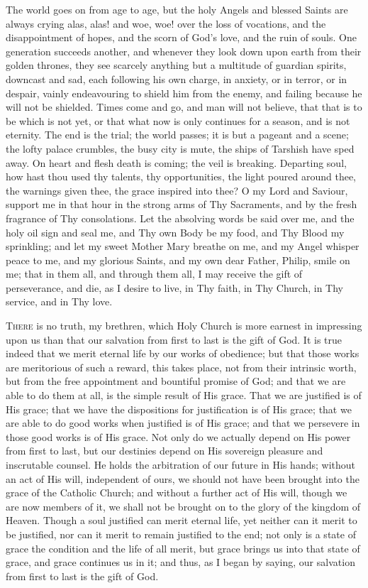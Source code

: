 The world goes on from age to age, but the holy Angels and blessed
Saints are always crying alas, alas! and woe, woe! over the loss of
vocations, and the disappointment of hopes, and the scorn of God's
love, and the ruin of souls. One generation succeeds another, and
whenever they look down upon earth from their golden thrones, they see
scarcely anything but a multitude of guardian spirits, downcast and
sad, each following his own charge, in anxiety, or in terror, or in
despair, vainly endeavouring to shield him from the enemy, and failing
because he will not be shielded. Times come and go, and man will not
believe, that that is to be which is not yet, or that what now is only
continues for a season, and is not eternity. The end is the trial; the
world passes; it is but a pageant and a scene; the lofty palace
crumbles, the busy city is mute, the ships of Tarshish have sped away.
On heart and flesh death is coming; the veil is breaking. Departing
soul, how hast thou used thy talents, thy opportunities, the light
poured around thee, the warnings given thee, the grace inspired into
thee? O my Lord and Saviour, support me in that hour in the strong
arms of Thy Sacraments, and by the fresh fragrance of Thy
consolations. Let the absolving words be said over me, and the holy
oil sign and seal me, and Thy own Body be my food, and Thy Blood my
sprinkling; and let my sweet Mother Mary breathe on me, and my Angel
whisper peace to me, and my glorious Saints, and my own dear Father,
Philip, smile on me; that in them all, and through them all, I may
receive the gift of perseverance, and die, as I desire to live, in Thy
faith, in Thy Church, in Thy service, and in Thy love.


T\textsc{here} is no truth, my brethren, which Holy Church is more earnest
in impressing upon us than that our salvation from first to last is
the gift of God. It is true indeed that we merit eternal life by our
works of obedience; but that those works are meritorious of such a
reward, this takes place, not from their intrinsic worth, but from the
free appointment and bountiful promise of God; and that we are able to
do them at all, is the simple result of His grace. That we are
justified is of His grace; that we have the dispositions for
justification is of His grace; that we are able to do good works when
justified is of His grace; and that we persevere in those good works
is of His grace. Not only do we actually depend on His power from
first to last, but our destinies depend on His sovereign pleasure and
inscrutable counsel. He holds the arbitration of our future in His
hands; without an act of His will, independent of ours, we should not
have been brought into the grace of the Catholic Church; and without a
further act of His will, though we are now members of it, we shall not
be brought on to the glory of the kingdom of Heaven. Though a soul
justified can merit eternal life, yet neither can it merit to be
justified, nor can it merit to remain justified to the end; not only
is a state of grace the condition and the life of all merit, but grace
brings us into that state of grace, and grace continues us in it; and
thus, as I began by saying, our salvation from first to last is the
gift of God.


